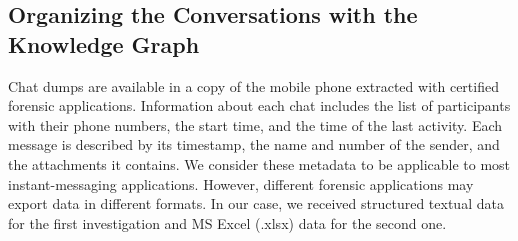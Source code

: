 
        
    \subsection{Organizing the Conversations with the Knowledge Graph} \label{sec:metadata_kg}
Chat dumps are available in a copy of the mobile phone extracted with certified forensic applications. %
Information about each chat includes the list of participants with their phone numbers, the start time, and the time of the last activity. Each message is described by its timestamp, the name and number of the sender, and the attachments it contains.
We consider these metadata to be applicable to most instant-messaging applications. 
However, different forensic applications may export data in different formats. In our case, we received structured textual data for the first investigation and MS Excel (.xlsx) data for the second one.




